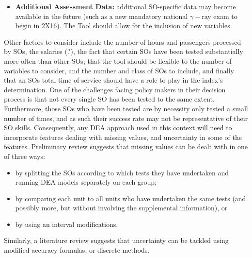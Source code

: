 \begin{itemize}[noitemsep]
\item \textbf{Additional Assessment Data:} additional SO-specific data may become available in the future (such as a new mandatory national $\gamma-$ray exam to begin in 2X16). The Tool should allow for the inclusion of new variables. \end{itemize} Other factors to consider include the number of hours and passengers processed by SOs, the salaries (?), the fact that certain SOs have been tested substantially more often than other SOs; that the tool should be flexible to the number of variables to consider, and the number and class of SOs to include, and finally that an SOs total time of service should have a role to play in the index's determination. 
\newl One of the challenges facing policy makers in their decision process is that not every single SO has been tested to the same extent. Furthermore, those SOs who have been tested are by necessity only tested a small number of times, and as such their success rate may not be representative of their SO skills. Consequently, any DEA approach used in this context will need to incorporate features dealing with missing values, and uncertainty in some of the features. \newl Preliminary review suggests that missing values can be dealt with in one of three ways: \begin{itemize}[noitemsep]
\item by splitting the SOs according to which tests they have undertaken and running DEA models separately on each group; 
\item by comparing each unit to all units who have undertaken the same tests (and possibly more, but without involving the supplemental information), or 
\item by using an interval modifications. 
\end{itemize}
Similarly, a literature review suggests that uncertainty can be tackled using modified accuracy formulas, or discrete methods.
